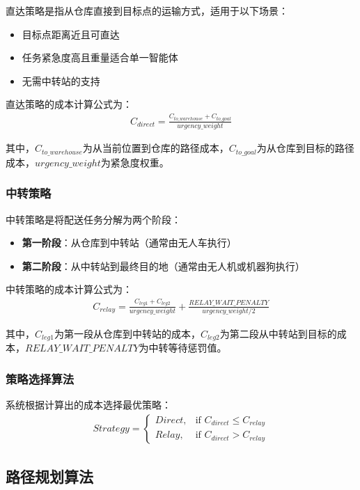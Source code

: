 \documentclass[12pt,a4paper]{article}
\begin{document}
直达策略是指从仓库直接到目标点的运输方式，适用于以下场景：
\begin{itemize}
    \item 目标点距离近且可直达
    \item 任务紧急度高且重量适合单一智能体
    \item 无需中转站的支持
\end{itemize}

直达策略的成本计算公式为：
\begin{align}
C_{direct} = \frac{C_{to\_warehouse} + C_{to\_goal}}{urgency\_weight}
\end{align}

其中，$C_{to\_warehouse}$为从当前位置到仓库的路径成本，$C_{to\_goal}$为从仓库到目标的路径成本，$urgency\_weight$为紧急度权重。

\subsubsection{中转策略}

中转策略是将配送任务分解为两个阶段：
\begin{itemize}
    \item \textbf{第一阶段}：从仓库到中转站（通常由无人车执行）
    \item \textbf{第二阶段}：从中转站到最终目的地（通常由无人机或机器狗执行）
\end{itemize}

中转策略的成本计算公式为：
\begin{align}
C_{relay} = \frac{C_{leg1} + C_{leg2}}{urgency\_weight} + \frac{RELAY\_WAIT\_PENALTY}{urgency\_weight/2}
\end{align}

其中，$C_{leg1}$为第一段从仓库到中转站的成本，$C_{leg2}$为第二段从中转站到目标的成本，$RELAY\_WAIT\_PENALTY$为中转等待惩罚值。

\subsubsection{策略选择算法}

系统根据计算出的成本选择最优策略：
\begin{align}
Strategy = 
\begin{cases}
Direct, & \text{if } C_{direct} \leq C_{relay} \\
Relay, & \text{if } C_{direct} > C_{relay}
\end{cases}
\end{align}

\subsection{路径规划算法}
\end{document}
